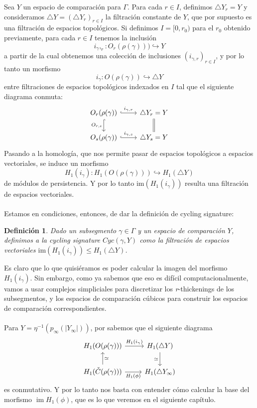 \documentclass[12pt,a4paper]{article}
\newtheorem{definition}[theorem]{Definición}
\begin{document}
Sea $Y$ un espacio de comparación para $\Gamma$. Para cada $r \in I$, definimos $\triangle Y_r = Y$ y consideramos $\triangle Y = (\triangle Y_r)_{r \in I}$ la filtración constante de $Y$, que por supuesto es una filtración de espacios topológicos. Si definimos $I = [0,r_0)$ para el $r_0$ obtenido previamente, para cada $r \in I$ tenemos la inclusión
\[
    i_\gamma,_r : {O_r}(\rho(\gamma))) \hookrightarrow Y
\]
a partir de la cual obtenemos una colección de inclusiones $(i_{\gamma,r})_{r \in I}$, y por lo tanto un morfismo
\[
    i_\gamma : O(\rho(\gamma)) \hookrightarrow \triangle Y
\]
entre filtraciones de espacios topológicos indexados en $I$ tal que el siguiente diagrama conmuta:
\[
\begin{tikzcd}
O_r(\rho(\gamma)) \arrow[r, hookrightarrow, "i_{\gamma, r}"] \arrow[d, hookrightarrow, "O_{r,s}"'] & \triangle Y_r=Y \arrow[d, equal] \\
O_s(\rho(\gamma)) \arrow[r, hookrightarrow, "i_{\gamma, s}"] & \triangle Y_s=Y
\end{tikzcd}
\]
Pasando a la homología, que nos permite pasar de espacios topológicos a espacios vectoriales, se induce un morfismo
\[
H_1(i_\gamma) : H_1({O}(\rho(\gamma))) \hookrightarrow H_1(\triangle Y)
\]
de módulos de persistencia. Y por lo tanto $\text{im}(H_1(i_\gamma))$ resulta una filtración de espacios vectoriales.
\\
\\
Estamos en condiciones, entonces, de dar la definición de cycling signature:
\begin{definition}
    Dado un subsegmento $\gamma \in \Gamma$ y un espacio de comparación $Y$, definimos a la cycling signature $Cyc(\gamma, Y)$ como la filtración de espacios vectoriales $\text{im}(H_1(i_\gamma)) \leq H_1(\triangle Y)$.
\end{definition}
Es claro que lo que quisiéramos es poder calcular la imagen del morfismo $H_1(i_\gamma)$. Sin embargo, como ya sabemos que eso es difícil computacionalmente, vamos a usar complejos simpliciales para discretizar los \textit{r}-thickenings de los subsegmentos, y los espacios de comparación cúbicos para construir los espacios de comparación correspondientes.
\\
\\
Para $Y = \eta^{-1}(p_\infty(|Y_\infty|))$, por \cite{cycling-sigs} sabemos que el siguiente diagrama
\[
\begin{tikzcd}
    H_1(O(\rho(\gamma))) \arrow[r, "H_1(i_{\gamma})"] & H_1(\triangle Y) \arrow[d, "\simeq"'] 
    \\
    H_1(\check{C}(\rho(\gamma))) \arrow[u, "\simeq"'] \arrow[r, "H_1(\phi)"'] & H_1(\triangle Y_\infty)
\end{tikzcd}
\]
es conmutativo. Y por lo tanto nos basta con entender cómo calcular la base del morfismo $\operatorname{im}H_1(\phi)$, que es lo que veremos en el siguiente capítulo.
\newpage
\end{document}
